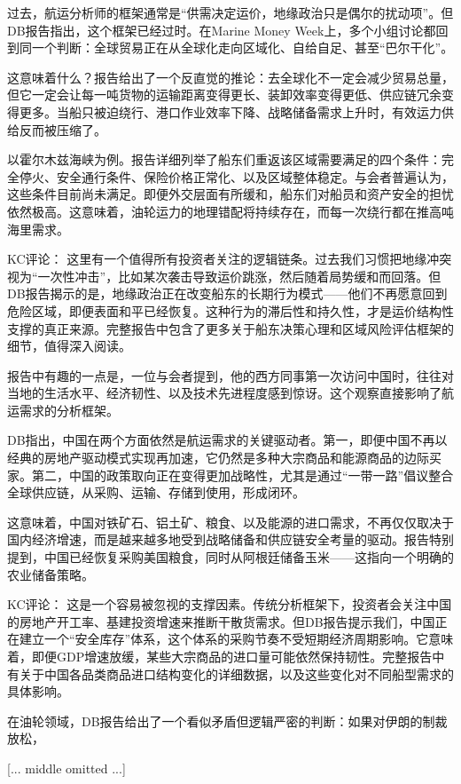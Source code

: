 \documentclass[11pt]{ctexart}
\begin{document}
过去，航运分析师的框架通常是“供需决定运价，地缘政治只是偶尔的扰动项”。但DB报告指出，这个框架已经过时。在Marine Money Week上，多个小组讨论都回到同一个判断：全球贸易正在从全球化走向区域化、自给自足、甚至“巴尔干化”。

这意味着什么？报告给出了一个反直觉的推论：去全球化不一定会减少贸易总量，但它一定会让每一吨货物的运输距离变得更长、装卸效率变得更低、供应链冗余变得更多。当船只被迫绕行、港口作业效率下降、战略储备需求上升时，有效运力供给反而被压缩了。

以霍尔木兹海峡为例。报告详细列举了船东们重返该区域需要满足的四个条件：完全停火、安全通行条件、保险价格正常化、以及区域整体稳定。与会者普遍认为，这些条件目前尚未满足。即便外交层面有所缓和，船东们对船员和资产安全的担忧依然极高。这意味着，油轮运力的地理错配将持续存在，而每一次绕行都在推高吨海里需求。

KC评论： 这里有一个值得所有投资者关注的逻辑链条。过去我们习惯把地缘冲突视为“一次性冲击”，比如某次袭击导致运价跳涨，然后随着局势缓和而回落。但DB报告揭示的是，地缘政治正在改变船东的长期行为模式——他们不再愿意回到危险区域，即便表面和平已经恢复。这种行为的滞后性和持久性，才是运价结构性支撑的真正来源。完整报告中包含了更多关于船东决策心理和区域风险评估框架的细节，值得深入阅读。

报告中有趣的一点是，一位与会者提到，他的西方同事第一次访问中国时，往往对当地的生活水平、经济韧性、以及技术先进程度感到惊讶。这个观察直接影响了航运需求的分析框架。

DB指出，中国在两个方面依然是航运需求的关键驱动者。第一，即便中国不再以经典的房地产驱动模式实现再加速，它仍然是多种大宗商品和能源商品的边际买家。第二，中国的政策取向正在变得更加战略性，尤其是通过“一带一路”倡议整合全球供应链，从采购、运输、存储到使用，形成闭环。

这意味着，中国对铁矿石、铝土矿、粮食、以及能源的进口需求，不再仅仅取决于国内经济增速，而是越来越多地受到战略储备和供应链安全考量的驱动。报告特别提到，中国已经恢复采购美国粮食，同时从阿根廷储备玉米——这指向一个明确的农业储备策略。

KC评论： 这是一个容易被忽视的支撑因素。传统分析框架下，投资者会关注中国的房地产开工率、基建投资增速来推断干散货需求。但DB报告提示我们，中国正在建立一个“安全库存”体系，这个体系的采购节奏不受短期经济周期影响。它意味着，即便GDP增速放缓，某些大宗商品的进口量可能依然保持韧性。完整报告中有关于中国各品类商品进口结构变化的详细数据，以及这些变化对不同船型需求的具体影响。

在油轮领域，DB报告给出了一个看似矛盾但逻辑严密的判断：如果对伊朗的制裁放松，

[... middle omitted ...]
\end{document}
